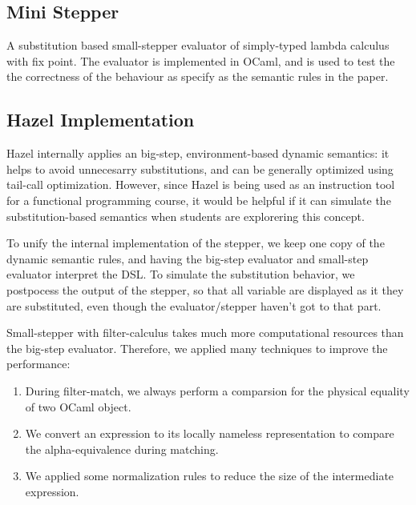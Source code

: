 \subsection{Mini Stepper}

A substitution based small-stepper evaluator of simply-typed lambda
calculus with fix point. The evaluator is implemented in OCaml, and is
used to test the the correctness of the behaviour as specify as the
semantic rules in the paper.

\subsection{Hazel Implementation}

Hazel internally applies an big-step, environment-based dynamic
semantics: it helps to avoid unnecesarry substitutions, and can be
generally optimized using tail-call optimization. However, since Hazel
is being used as an instruction tool for a functional programming
course, it would be helpful if it can simulate the substitution-based
semantics when students are explorering this concept.

To unify the internal implementation of the stepper, we keep one copy
of the dynamic semantic rules, and having the big-step evaluator and
small-step evaluator interpret the DSL. To simulate the substitution
behavior, we postpocess the output of the stepper, so that all
variable are displayed as it they are substituted, even though the
evaluator/stepper haven't got to that part.

Small-stepper with filter-calculus takes much more computational
resources than the big-step evaluator. Therefore, we applied many
techniques to improve the performance:

\begin{enumerate}
\item During filter-match, we always perform a comparsion for the
  physical equality of two OCaml object.
\item We convert an expression to its locally nameless representation
  to compare the alpha-equivalence during matching.
\item We applied some normalization rules to reduce the size of the
  intermediate expression.
\end{enumerate}




